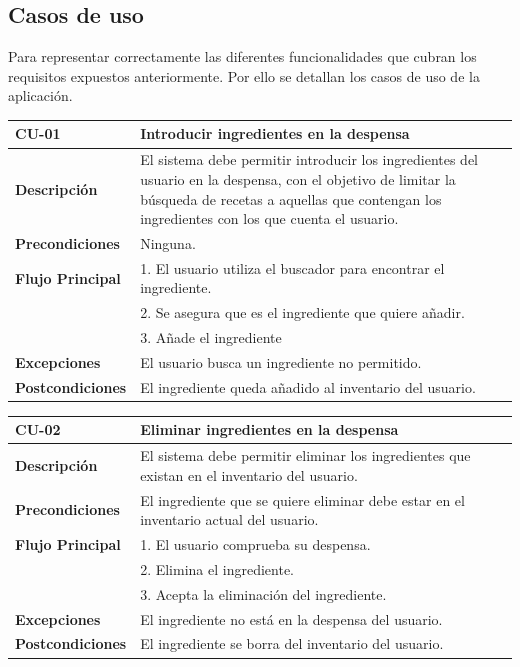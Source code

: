 \subsection{Casos de uso}
Para representar correctamente las diferentes funcionalidades que cubran los requisitos expuestos anteriormente. Por ello se detallan los casos de uso de la aplicación.
\begin{table}[H]
\begin{tabular}{|m{3cm}|m{9cm}|}
\hline
\textbf{CU-01} & Introducir ingredientes en la despensa \\
\hline
\textbf{Descripción} & El sistema debe permitir introducir los ingredientes del usuario en la despensa, con el objetivo de limitar la búsqueda de recetas a aquellas que contengan los ingredientes con los que cuenta el usuario.\\
\hline
\textbf{Precondiciones} & Ninguna. \\
\hline
\textbf{Flujo Principal} & 
1. El usuario utiliza el buscador para encontrar el ingrediente. \\
& 2. Se asegura que es el ingrediente que quiere añadir. \\
& 3. Añade el ingrediente \\
\hline
\textbf{Excepciones} & El usuario busca un ingrediente no permitido. \\
\hline
\textbf{Postcondiciones} & El ingrediente queda añadido al inventario del usuario. \\
\hline
\end{tabular}
\label{Tab:Cu-01}
\end{table}
\begin{table}[H]
\begin{tabular}{|m{3cm}|m{9cm}|}
\hline
\textbf{CU-02} & Eliminar ingredientes en la despensa \\
\hline
\textbf{Descripción} & El sistema debe permitir eliminar los ingredientes que existan en el inventario del usuario.\\
\hline
\textbf{Precondiciones} & El ingrediente que se quiere eliminar debe estar en el inventario actual del usuario. \\
\hline
\textbf{Flujo Principal} & 
1. El usuario comprueba su despensa. \\
& 2. Elimina el ingrediente. \\
& 3. Acepta la eliminación del ingrediente. \\
\hline
\textbf{Excepciones} & El ingrediente no está en la despensa del usuario. \\
\hline
\textbf{Postcondiciones} & El ingrediente se borra del inventario del usuario.\\
\hline
\end{tabular}
\label{Tab:Cu-02}
\end{table}
